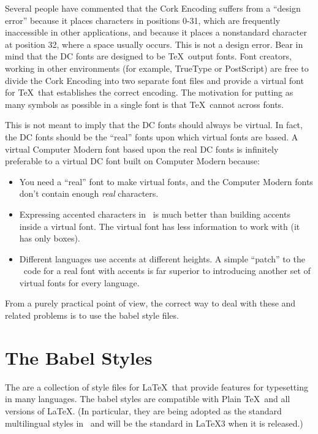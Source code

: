 % 

Several people have commented that the Cork Encoding suffers from a
``design error'' because it places characters in positions 0-31, which
are frequently inaccessible in other applications, and because it places a
nonstandard character at position 32, where a space usually occurs.
This is not a design error.  Bear in mind that the DC fonts are
designed to be \TeX\ output fonts.  Font creators, working in other
environments (for example, TrueType or PostScript) are free to divide
the Cork Encoding into two separate font files and provide a virtual
font for \TeX\ that establishes the correct encoding.  The motivation
for putting as many symbols as possible in a single font is that \TeX\
cannot  across fonts.

This is not meant to imply that the DC fonts should always be 
virtual.
In fact, the DC fonts should be the ``real'' fonts upon which virtual
fonts are based.  
A virtual Computer Modern font based upon the real
DC fonts is infinitely preferable to a virtual DC font built on Computer Modern
because:

\begin{itemize}
  \item You need a ``real'' font to make virtual fonts, and the Computer
        Modern fonts don't contain enough {\em real\/} characters.
  \item Expressing accented characters in \MF\ is much better than
        building accents inside a virtual font.  The virtual font
        has less information to work with (it has only boxes).
  \item Different languages use accents at different heights.  A simple
        ``patch'' to the \MF\ code for a real font with accents is
        far superior to introducing another set of virtual fonts
        for every language.
\end{itemize}

From a purely practical point of view, the correct way to deal with 
these and related problems is to use the babel style files.  

\section{The Babel Styles}
\label{sec:babel}

The  are a 
collection of style files for \LaTeX\ that
provide features for typesetting in many languages.
The babel styles are
compatible with Plain \TeX\ and all versions of \LaTeX. (In particular,
they are being adopted as the standard multilingual styles in \LaTeXe\
and will be the standard in \LaTeX3 when it is released.)

